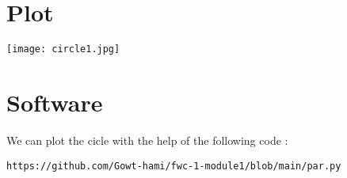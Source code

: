 \begin{center}
 \section{Plot}
\texttt{[image: circle1.jpg]}
  \section{Software}
  We can plot the cicle with the help of the following code :
 \vspace{3mm} 
\begin{lstlisting}
https://github.com/Gowt-hami/fwc-1-module1/blob/main/par.py
\end{lstlisting}
\end{center}

